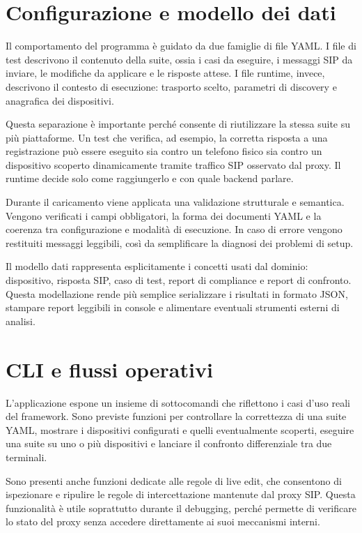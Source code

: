 \section{Configurazione e modello dei dati}

Il comportamento del programma \`e guidato da due famiglie di file YAML. I file di test descrivono il contenuto della suite, ossia i casi da eseguire, i messaggi SIP da inviare, le modifiche da applicare e le risposte attese. I file runtime, invece, descrivono il contesto di esecuzione: trasporto scelto, parametri di discovery e anagrafica dei dispositivi.

Questa separazione \`e importante perch\'e consente di riutilizzare la stessa suite su pi\`u piattaforme. Un test che verifica, ad esempio, la corretta risposta a una registrazione pu\`o essere eseguito sia contro un telefono fisico sia contro un dispositivo scoperto dinamicamente tramite traffico SIP osservato dal proxy. Il runtime decide solo come raggiungerlo e con quale backend parlare.

Durante il caricamento viene applicata una validazione strutturale e semantica. Vengono verificati i campi obbligatori, la forma dei documenti YAML e la coerenza tra configurazione e modalit\`a di esecuzione. In caso di errore vengono restituiti messaggi leggibili, cos\`i da semplificare la diagnosi dei problemi di setup.

Il modello dati rappresenta esplicitamente i concetti usati dal dominio: dispositivo, risposta SIP, caso di test, report di compliance e report di confronto. Questa modellazione rende pi\`u semplice serializzare i risultati in formato JSON, stampare report leggibili in console e alimentare eventuali strumenti esterni di analisi.

\section{CLI e flussi operativi}

L'applicazione espone un insieme di sottocomandi che riflettono i casi d'uso reali del framework. Sono previste funzioni per controllare la correttezza di una suite YAML, mostrare i dispositivi configurati e quelli eventualmente scoperti, eseguire una suite su uno o pi\`u dispositivi e lanciare il confronto differenziale tra due terminali.

Sono presenti anche funzioni dedicate alle regole di live edit, che consentono di ispezionare e ripulire le regole di intercettazione mantenute dal proxy SIP. Questa funzionalit\`a \`e utile soprattutto durante il debugging, perch\'e permette di verificare lo stato del proxy senza accedere direttamente ai suoi meccanismi interni.

